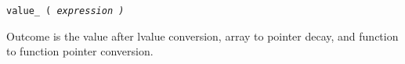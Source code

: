 
\tt{value_ (} \it{expression} \tt{)}


Outcome is the value after lvalue conversion,
array to pointer decay, and function to function pointer conversion.
